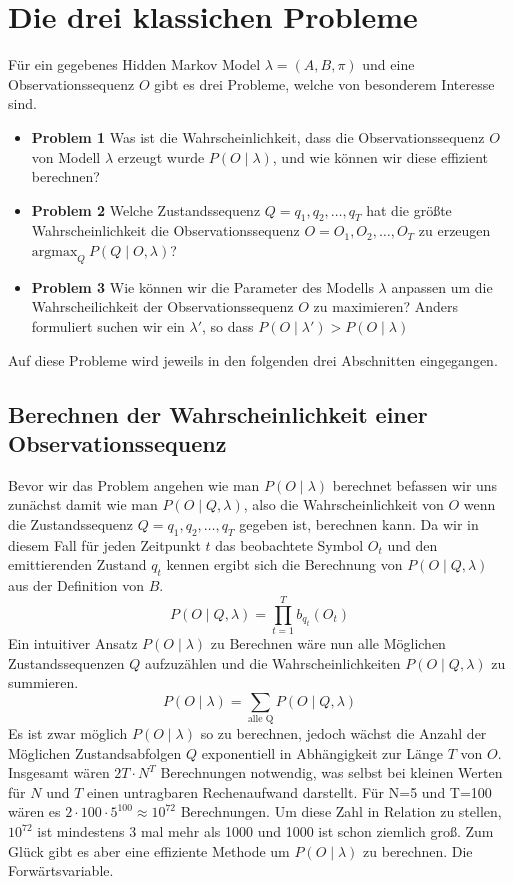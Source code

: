 \section{Die drei klassichen Probleme}
Für ein gegebenes Hidden Markov Model $\lambda = (A, B, \pi)$ und eine Observationssequenz $O$ gibt es drei Probleme, welche von besonderem Interesse sind.
\begin{itemize}
    \item \textbf{Problem 1} Was ist die Wahrscheinlichkeit, dass die Observationssequenz $O$ von Modell $\lambda$ erzeugt wurde $P(O \mid \lambda)$, und wie können wir diese effizient berechnen?
    \item \textbf{Problem 2} Welche Zustandssequenz $Q=q_1, q_2, \dots, q_T$ hat die größte Wahrscheinlichkeit die Observationssequenz $O=O_1, O_2, \dots, O_T$ zu erzeugen $\text{argmax}_Q \ P(Q \mid O, \lambda)$?
    \item \textbf{Problem 3} Wie können wir die Parameter des Modells $\lambda$ anpassen um die Wahrscheilichkeit der Observationssequenz $O$ zu maximieren? Anders formuliert suchen wir ein $\lambda'$, so dass $P(O \mid \lambda') > P(O \mid \lambda)$
\end{itemize}
Auf diese Probleme wird jeweils in den folgenden drei Abschnitten eingegangen.

\subsection{Berechnen der Wahrscheinlichkeit einer Observationssequenz}
Bevor wir das Problem angehen wie man $P(O \mid \lambda)$ berechnet befassen wir uns zunächst damit wie man $P(O \mid Q, \lambda)$, also die Wahrscheinlichkeit von $O$ wenn die Zustandssequenz $Q = q_1, q_2, \dots, q_T$ gegeben ist, berechnen kann. Da wir in diesem Fall für jeden Zeitpunkt $t$ das beobachtete Symbol $O_t$ und den emittierenden Zustand $q_t$ kennen ergibt sich die Berechnung von $P(O \mid Q, \lambda)$ aus der Definition von $B$.
\begin{equation*}
    P(O \mid Q, \lambda) =  \prod_{t=1}^{T} b_{q_t}(O_t)
\end{equation*}
Ein intuitiver Ansatz $P(O \mid \lambda)$ zu Berechnen wäre nun alle Möglichen Zustandssequenzen $Q$ aufzuzählen und die Wahrscheinlichkeiten $P(O \mid Q, \lambda)$ zu summieren.
\begin{equation*}
    P(O \mid \lambda) = \sum_{\text{alle Q}} P(O \mid Q, \lambda ) 
\end{equation*}
Es ist zwar möglich $P(O \mid \lambda)$ so zu berechnen, jedoch wächst die Anzahl der Möglichen Zustandsabfolgen $Q$ exponentiell in Abhängigkeit zur Länge $T$ von $O$. Insgesamt wären $2T \cdot N^T$ Berechnungen notwendig, was selbst bei kleinen Werten für $N$ und $T$ einen untragbaren Rechenaufwand darstellt. Für N=5 und T=100 wären es $2 \cdot 100 \cdot 5^{100} \approx 10^{72}$ Berechnungen. Um diese Zahl in Relation zu stellen, $10^{72}$ ist mindestens 3 mal mehr als 1000 und 1000 ist schon ziemlich groß. Zum Glück gibt es aber eine effiziente Methode um $P(O \mid \lambda)$ zu berechnen. Die Forwärtsvariable.


